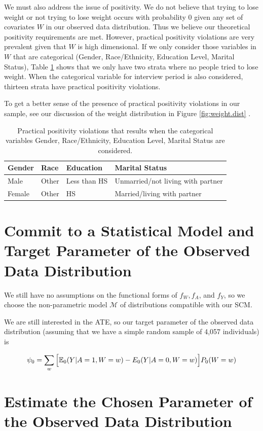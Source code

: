 \documentclass{article}
\begin{document}
We must also address the issue of positivity.  We do not believe that trying to lose weight or not trying to lose weight occurs with probability $0$ given any set of covariates $W$ in our observed data distribution.  Thus we believe our theoretical positivity requirements are met.  However, practical positivity violations are very prevalent given that $W$ is high dimensional.  If we only consider those variables in $W$ that are categorical (Gender, Race/Ethnicity, Education Level, Marital Status), Table \ref{tab:prac.pos}  shows that we only have two strata where no people tried to lose weight. When the categorical variable for interview period is also considered, thirteen strata have practical positivity violations.

To get a better sense of the presence of practical positivity violations in our sample, see our discussion of the weight distribution in Figure \ref{fig:weight.dist} .

\begin{table}[ht]
\centering
\begin{tabular}{| l | l | l | l |}
\hline
 Gender & Race & Education & Marital Status \\
\hline
Male & Other & Less than HS & Unmarried/not living with partner \\
Female & Other & HS & Married/living with partner \\
\hline
\end{tabular}
\caption{Practical positivity violations that results when the categorical variables Gender, Race/Ethnicity, Education Level, Marital Status are considered.}
\label{tab:prac.pos}
\end{table}

\section{Commit to a Statistical Model and Target Parameter of the Observed Data Distribution}

We still have no assumptions on the functional forms of $f_W, f_A$, and $f_Y$, so we choose the non-parametric model $\mathcal{M}$ of distributions compatible with our SCM.  

We are still interested in the ATE, so our target parameter of the observed data distribution (assuming that we have a simple random sample of 4,057 individuals) is

$$\psi_0 = \sum_{w}\Big[\mathbb{E}_0(Y|A=1,W=w)-E_0(Y|A=0,W=w)\Big]P_0(W=w)$$

\section{Estimate the Chosen Parameter of the Observed Data Distribution}
\label{sec:estimates}
\end{document}
